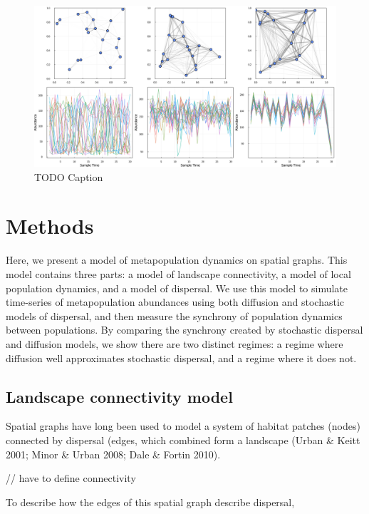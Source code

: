 \documentclass[10pt,oneside]{article}
\makeatletter
\def\maxwidth{\ifdim\Gin@nat@width>\linewidth\linewidth
\else\Gin@nat@width\fi}
\let\Oldincludegraphics\includegraphics
\renewcommand{\includegraphics}[1]{\Oldincludegraphics[width=\maxwidth]{#1}}
\makeatother
\begin{document}
\begin{figure}
\hypertarget{fig:example}{%
\centering
\includegraphics{./figures/synchrony_example.png}
\caption{TODO Caption}\label{fig:example}
}
\end{figure}

\hypertarget{methods}{%
\section{Methods}\label{methods}}

Here, we present a model of metapopulation dynamics on spatial graphs.
This model contains three parts: a model of landscape connectivity, a
model of local population dynamics, and a model of dispersal. We use
this model to simulate time-series of metapopulation abundances using
both diffusion and stochastic models of dispersal, and then measure the
synchrony of population dynamics between populations. By comparing the
synchrony created by stochastic dispersal and diffusion models, we show
there are two distinct regimes: a regime where diffusion well
approximates stochastic dispersal, and a regime where it does not.

\hypertarget{landscape-connectivity-model}{%
\subsection{Landscape connectivity
model}\label{landscape-connectivity-model}}

Spatial graphs have long been used to model a system of habitat patches
(nodes) connected by dispersal (edges, which combined form a landscape
(Urban \& Keitt 2001; Minor \& Urban 2008; Dale \& Fortin 2010).

// have to define connectivity

To describe how the edges of this spatial graph describe dispersal,
\end{document}
